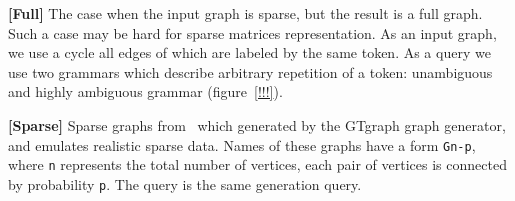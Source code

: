 \textbf{[Full]} The case when the input graph is sparse, but the result is a full graph.
Such a case may be hard for sparse matrices representation.
As an input graph, we use a cycle all edges of which are labeled by the same token.
As a query we use two grammars which describe arbitrary repetition of a token: unambiguous and highly ambiguous grammar (figure~\ref{!!!}).

\textbf{[Sparse]} Sparse graphs from~\cite{fan2018scaling} which generated by the GTgraph graph generator, and emulates realistic sparse data.
Names of these graphs have a form \texttt{Gn-p}, where \texttt{n} represents the total number of vertices, each pair of vertices is connected by probability \texttt{p}.
The query is the same generation query.

